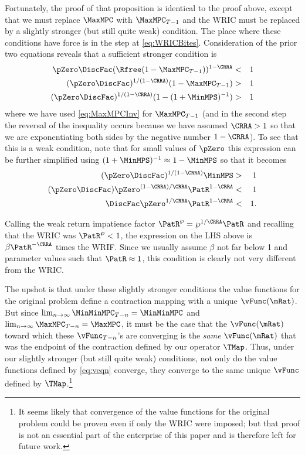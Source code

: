 \documentclass[titlepage]{\econtex}\providecommand{\texname}{BufferStockTheory}%
\begin{document}
Fortunately, the proof of that proposition is identical to the proof above, except that we must replace
$\MaxMPC$ with $\MaxMPC_{T-1}$ and the WRIC must be
replaced by a slightly stronger (but still quite weak) condition.  The place where these
conditions have force is in the step at \eqref{eq:WRICBites}.
Consideration of the prior two equations reveals that
a sufficient stronger condition is
\begin{eqnarray*}
    \pZero \DiscFac (\Rfree (1-\MaxMPC_{T-1}))^{1-\CRRA} & < & 1
\\  (\pZero \DiscFac)^{1/(1-\CRRA)}  (1-\MaxMPC_{T-1}) & > & 1
\\  (\pZero \DiscFac)^{1/(1-\CRRA)}  (1-(1+\MinMPS)^{-1}) & > & 1
\end{eqnarray*}
where we have used \eqref{eq:MaxMPCInv} for $\MaxMPC_{T-1}$ (and in the second step the reversal of the inequality occurs because we have assumed $\CRRA > 1$ so that we are exponentiating both sides by the negative number $1-\CRRA$).  To see that this is a weak condition, note that for small values of
$\pZero$ this expression can be further simplified using $(1+\MinMPS)^{-1}
\approx 1-\MinMPS$ so that it becomes
\begin{eqnarray*}
  (\pZero \DiscFac)^{1/(1-\CRRA)}  \MinMPS & > & 1
\\  (\pZero \DiscFac)  \pZero^{(1-\CRRA)/\CRRA} \PatR^{1-\CRRA} & < & 1
\\  \DiscFac  \pZero^{1/\CRRA} \PatR^{1-\CRRA} & < & 1.
\end{eqnarray*}

Calling the weak return impatience factor $\PatR^{\wp}=\wp^{1/\CRRA}\PatR$ and
recalling that the WRIC was $\PatR^{\wp}<1$, the expression on the LHS
above is $\beta \PatR^{-\CRRA}$ times the WRIF.  Since we usually assume $\beta$ not far below 1 and
parameter values such that $\PatR \approx 1$, this condition is clearly not very
different from the WRIC.

The upshot is that under these slightly stronger conditions the value
functions for the original problem define a contraction mapping with a
unique $\vFunc(\mRat)$.  But since $\lim_{n \rightarrow \infty}
\MinMinMPC_{T-n} = \MinMinMPC$ and $\lim_{n \rightarrow \infty}
\MaxMPC_{T-n} = \MaxMPC$, it must be the case that the $\vFunc(\mRat)$
toward which these $\vFunc_{T-n}$'s are converging is the {\it same}
$\vFunc(\mRat)$ that was the endpoint of the contraction defined by
our operator $\TMap$.  Thus, under our slightly stronger (but still
quite weak) conditions, not only do the value functions defined by
\eqref{eq:veqn} converge, they converge to the same unique $\vFunc$
defined by $\TMap$.\footnote{It seems likely that convergence of the
  value functions for the original problem could be proven even if
  only the WRIC were imposed; but that proof is not an essential part
  of the enterprise of this paper and is therefore left for future
  work.}
\end{document}
